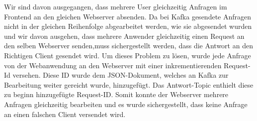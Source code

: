 Wir sind davon ausgegangen, dass mehrere User gleichzeitig Anfragen im Frontend an den gleichen Webserver absenden. Da bei Kafka gesendete Anfragen nicht in der gleichen Reihenfolge abgearbeitet werden, wie sie abgesendet wurden und wir davon ausgehen, dass mehrere Anwender gleichzeitig einen Request an den selben Webserver senden,muss sichergestellt werden, dass die Antwort an den Richtigen Client gesendet wird. 
Um dieses Problem zu lösen, wurde jede Anfrage von der Webanwendung an den Webserver mit einer inkrementierenden Request-Id versehen.
Diese ID wurde dem JSON-Dokument, welches an Kafka zur Bearbeitung weiter gereicht wurde, hinzugefügt. Das Antwort-Topic enthielt diese zu beginn hinzugefügte Request-ID. Somit konnte der Webserver mehrere Anfragen gleichzeitig bearbeiten und es wurde sichergestellt, dass keine Anfrage an einen falschen Client versendet wird.
